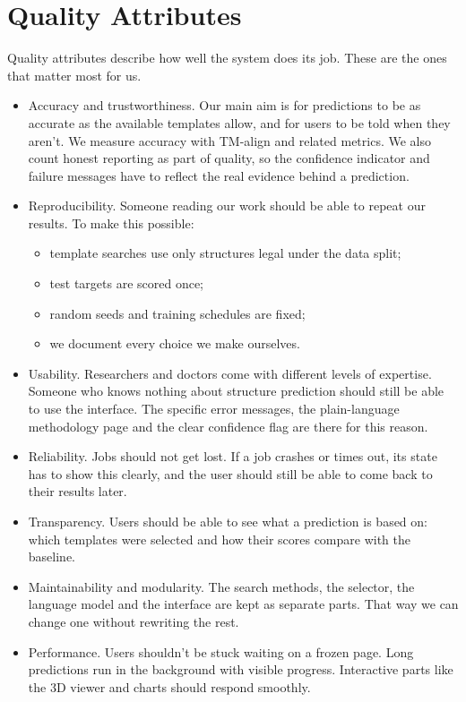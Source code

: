 \documentclass{FastFyp}
\begin{document}
\section{Quality Attributes}
Quality attributes describe how well the system does its job. These are the ones that matter most for us.
\begin{itemize}
\item Accuracy and trustworthiness. Our main aim is for predictions to be as accurate as the available templates allow, and for users to be told when they aren't. We measure accuracy with TM-align and related metrics. We also count honest reporting as part of quality, so the confidence indicator and failure messages have to reflect the real evidence behind a prediction.
\item Reproducibility. Someone reading our work should be able to repeat our results. To make this possible:
  \begin{itemize}
  \item template searches use only structures legal under the data split;
  \item test targets are scored once;
  \item random seeds and training schedules are fixed;
  \item we document every choice we make ourselves.
  \end{itemize}
\item Usability. Researchers and doctors come with different levels of expertise. Someone who knows nothing about structure prediction should still be able to use the interface. The specific error messages, the plain-language methodology page and the clear confidence flag are there for this reason.
\item Reliability. Jobs should not get lost. If a job crashes or times out, its state has to show this clearly, and the user should still be able to come back to their results later.
\item Transparency. Users should be able to see what a prediction is based on: which templates were selected and how their scores compare with the baseline.
\item Maintainability and modularity. The search methods, the selector, the language model and the interface are kept as separate parts. That way we can change one without rewriting the rest.
\item Performance. Users shouldn't be stuck waiting on a frozen page. Long predictions run in the background with visible progress. Interactive parts like the 3D viewer and charts should respond smoothly.
\end{itemize}
\end{document}
